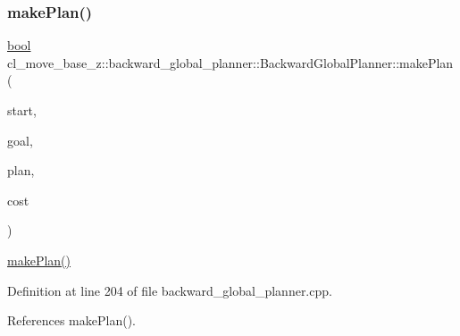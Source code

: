 \mbox{\label{classcl__move__base__z_1_1backward__global__planner_1_1BackwardGlobalPlanner_a2fe289017031d072f4ac32d017fe989d}} 
\subsubsection{\texorpdfstring{make\+Plan()}{makePlan()}\hspace{0.1cm}{\footnotesize\ttfamily [2/2]}}
{\footnotesize\ttfamily \hyperlink{classbool}{bool} cl\+\_\+move\+\_\+base\+\_\+z\+::backward\+\_\+global\+\_\+planner\+::\+Backward\+Global\+Planner\+::make\+Plan (\begin{DoxyParamCaption}\item[{const geometry\+\_\+msgs\+::\+Pose\+Stamped \&}]{start,  }\item[{const geometry\+\_\+msgs\+::\+Pose\+Stamped \&}]{goal,  }\item[{std\+::vector$<$ geometry\+\_\+msgs\+::\+Pose\+Stamped $>$ \&}]{plan,  }\item[{double \&}]{cost }\end{DoxyParamCaption})}

\hyperlink{classcl__move__base__z_1_1backward__global__planner_1_1BackwardGlobalPlanner_a3f1f3c81e7c52c9305544fd793741a41}{make\+Plan()} 

Definition at line 204 of file backward\+\_\+global\+\_\+planner.\+cpp.



References make\+Plan().


